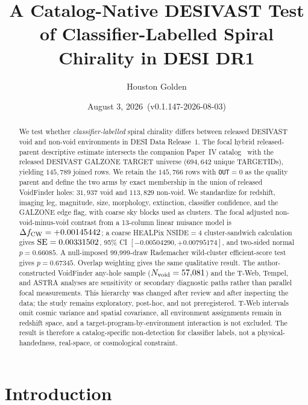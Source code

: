 \documentclass[twocolumn,linenumbers]{aastex702}
\newcommand{\paperVersion}{v0.1.147-2026-08-03}
\newcommand{\paperTimestamp}{August 3, 2026}
\begin{document}
\title{A Catalog-Native DESIVAST Test of Classifier-Labelled Spiral Chirality in DESI DR1}

\author{Houston Golden}

\date{\paperTimestamp\ (\paperVersion)}

\begin{abstract}
We test whether \emph{classifier-labelled} spiral chirality differs
between released DESIVAST~\cite{DESIVAST2025} void and non-void
environments in DESI Data Release~1. The focal hybrid released-parent descriptive estimate
intersects the companion Paper~IV catalog~\cite{golden_chirality_2026}
with the released DESIVAST GALZONE TARGET universe ($694{,}642$ unique
TARGETIDs), yielding $145{,}789$ joined rows. We retain the $145{,}766$
rows with \texttt{OUT}$=0$ as the quality parent and define the two arms
by exact membership in the union of released VoidFinder holes:
$31{,}937$ void and $113{,}829$ non-void. We standardize for redshift,
imaging leg, magnitude, size, morphology, extinction, classifier
confidence, and the GALZONE edge flag, with coarse sky blocks used as
clusters. The focal adjusted
non-void-minus-void contrast from a 13-column linear nuisance model is
$\Delta f_{\rm CW}=+0.00145442$; a coarse HEALPix NSIDE$=4$
cluster-sandwich calculation gives ${\rm SE}=0.00331502$, 95\% CI
$[-0.00504290,+0.00795174]$, and two-sided normal $p=0.66085$.
A null-imposed 99,999-draw Rademacher wild-cluster efficient-score test
gives $p=0.67345$. Overlap
weighting gives the same qualitative result. The author-constructed
VoidFinder any-hole sample ($N_{\rm void}=57{,}081$) and the T-Web,
Tempel, and ASTRA analyses are sensitivity or secondary diagnostic
paths rather than parallel focal measurements. This hierarchy was changed
after review and after inspecting the data; the study remains
exploratory, post-hoc, and not preregistered. T-Web intervals omit
cosmic variance and spatial covariance, all environment assignments
remain in redshift space, and a target-program-by-environment
interaction is not excluded. The result is therefore a catalog-specific
non-detection for classifier labels, not a physical-handedness,
real-space, or cosmological constraint.
\end{abstract}

\section{Introduction}\label{sec:intro}
\end{document}
